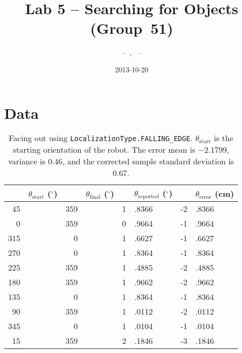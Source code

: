 \documentclass[twocolumn]{article}
\author{\bname~--~\bid, \name~--~\id}
\title{Lab 5 -- Searching for Objects (Group~51)}
\date{2013-10-20}
\def\degree{\ensuremath{^\circ}}
\begin{document}
\maketitle



\section{Data}

\begin{table*}[htb]
\begin{center}\begin{tabular}{r@{}l r@{}l r@{}l r@{}l}
&$\theta_{\text{start}}$ (\degree)& &$\theta_{\text{final}}$ (\degree)& &$\theta_{\text{reported}}$ (\degree)& &$\theta_{\text{error}}$ (cm) \\
\hline
45&& 359&& 1&.8366& -2&.8366 \\
0&& 359&& 0&.9664& -1&.9664 \\
315&& 0&& 1&.6627& -1&.6627 \\
270&& 0&& 1&.8364& -1&.8364 \\
225&& 359&& 1&.4885& -2&.4885 \\
180&& 359&& 1&.9662& -2&.9662 \\
135&& 0&& 1&.8364& -1&.8364 \\
90&& 359&& 1&.0112& -2&.0112 \\
345&& 0&& 1&.0104& -1&.0104 \\
15&& 359&& 2&.1846& -3&.1846 \\
\end{tabular}\end{center}
\caption{Facing out using {\tt LocalizationType.FALLING\_EDGE}.
$\theta_{\text{start}}$ is the starting orientation of the robot.
The error mean is $-2.1799$, variance is %
$0.46$, and the corrected sample standard deviation is %
$0.67$.}
\label{open}
\end{table*}
\end{document}
